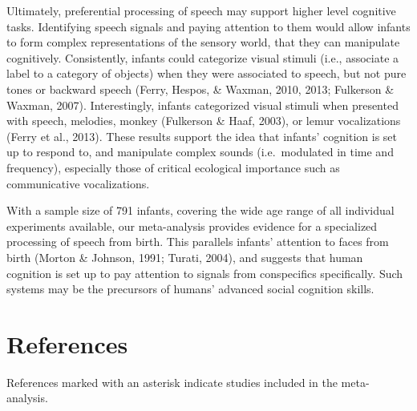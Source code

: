 \documentclass[
  english,
  man]{apa6}
\begin{document}
Ultimately, preferential processing of speech may support higher level cognitive tasks. Identifying speech signals and paying attention to them would allow infants to form complex representations of the sensory world, that they can manipulate cognitively. Consistently, infants could categorize visual stimuli (i.e., associate a label to a category of objects) when they were associated to speech, but not pure tones or backward speech (Ferry, Hespos, \& Waxman, 2010, 2013; Fulkerson \& Waxman, 2007). Interestingly, infants categorized visual stimuli when presented with speech, melodies, monkey (Fulkerson \& Haaf, 2003), or lemur vocalizations (Ferry et al., 2013). These results support the idea that infants' cognition is set up to respond to, and manipulate complex sounds (i.e.~modulated in time and frequency), especially those of critical ecological importance such as communicative vocalizations.

With a sample size of 791 infants, covering the wide age range of all individual experiments available, our meta-analysis provides evidence for a specialized processing of speech from birth. This parallels infants' attention to faces from birth (Morton \& Johnson, 1991; Turati, 2004), and suggests that human cognition is set up to pay attention to signals from conspecifics specifically. Such systems may be the precursors of humans' advanced social cognition skills.

\newpage

\hypertarget{references}{%
\section{References}\label{references}}

\begingroup
\setlength{\parindent}{-0.5in}
\setlength{\leftskip}{0.5in}

References marked with an asterisk indicate studies included in the meta-analysis.
\end{document}
